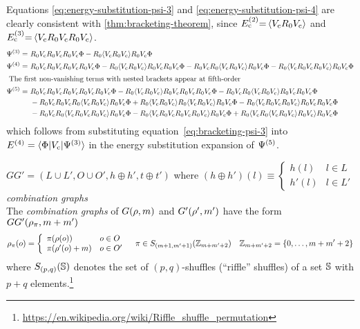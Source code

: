 \documentclass[11pt]{article}
\numberwithin{equation}{section}
\begin{document}
\begin{ex}
Equations \ref{eq:energy-substitution-psi-3} and \ref{eq:energy-substitution-psi-4} are clearly consistent with \cref{thm:bracketing-theorem}, since $E_{\mathrm{c}}^{(2)}{=}\,\langle V_{\mathrm{c}}R_0V_{\mathrm{c}}\rangle$ and $E_{\mathrm{c}}^{(3)}{=}\,\langle V_{\mathrm{c}}R_0V_{\mathrm{c}}R_0V_{\mathrm{c}}\rangle$.
\begin{align}
\label{eq:bracketing-psi-3}
  \Psi ^{(3)}
=&\
  R_0V_{\mathrm{c}}R_0V_{\mathrm{c}}R_0V_{\mathrm{c}}\Phi 
-
  R_0\langle V_{\mathrm{c}}R_0V_{\mathrm{c}}\rangle R_0V_{\mathrm{c}}\Phi 
\\
  \Psi ^{(4)}
=&\
  R_0V_{\mathrm{c}}R_0V_{\mathrm{c}}R_0V_{\mathrm{c}}R_0V_{\mathrm{c}}\Phi 
-
  R_0\langle V_{\mathrm{c}}R_0V_{\mathrm{c}}\rangle R_0V_{\mathrm{c}}R_0V_{\mathrm{c}}\Phi 
-
  R_0V_{\mathrm{c}}R_0\langle V_{\mathrm{c}}R_0V_{\mathrm{c}}\rangle R_0V_{\mathrm{c}}\Phi 
-
  R_0\langle V_{\mathrm{c}}R_0V_{\mathrm{c}}R_0V_{\mathrm{c}}\rangle R_0V_{\mathrm{c}}\Phi 
\\
\intertext{
The first non-vanishing terms with nested brackets appear at fifth-order
}
\nonumber
  \Psi ^{(5)}
=&\
  R_0V_{\mathrm{c}}R_0V_{\mathrm{c}}R_0V_{\mathrm{c}}R_0V_{\mathrm{c}}R_0V_{\mathrm{c}}\Phi 
-
  R_0\langle V_{\mathrm{c}}R_0V_{\mathrm{c}}\rangle R_0V_{\mathrm{c}}R_0V_{\mathrm{c}}R_0V_{\mathrm{c}}\Phi 
-
  R_0V_{\mathrm{c}}R_0\langle V_{\mathrm{c}}R_0V_{\mathrm{c}}\rangle R_0V_{\mathrm{c}}R_0V_{\mathrm{c}}\Phi 
\\&\
\nonumber
-
  R_0V_{\mathrm{c}}R_0V_{\mathrm{c}}R_0\langle V_{\mathrm{c}}R_0V_{\mathrm{c}}\rangle R_0V_{\mathrm{c}}\Phi 
+
  R_0\langle V_{\mathrm{c}}R_0V_{\mathrm{c}}\rangle R_0\langle V_{\mathrm{c}}R_0V_{\mathrm{c}}\rangle R_0V_{\mathrm{c}}\Phi 
-
  R_0\langle V_{\mathrm{c}}R_0V_{\mathrm{c}}R_0V_{\mathrm{c}}\rangle R_0V_{\mathrm{c}}R_0V_{\mathrm{c}}\Phi 
\\&\
-
  R_0V_{\mathrm{c}}R_0\langle V_{\mathrm{c}}R_0V_{\mathrm{c}}R_0V_{\mathrm{c}}\rangle R_0V_{\mathrm{c}}\Phi 
-
  R_0\langle V_{\mathrm{c}}R_0V_{\mathrm{c}}R_0V_{\mathrm{c}}R_0V_{\mathrm{c}}\rangle R_0V_{\mathrm{c}}\Phi 
+
  R_0\langle V_{\mathrm{c}}R_0\langle V_{\mathrm{c}}R_0V_{\mathrm{c}}\rangle R_0V_{\mathrm{c}}\rangle R_0V_{\mathrm{c}}\Phi 
\end{align}
which follows from substituting equation~\ref{eq:bracketing-psi-3} into $E^{(4)}=\langle\Phi |V_{\mathrm{c}}|\Psi ^{(3)}\rangle$ in the energy substitution expansion of $\Psi ^{(5)}$.
\end{ex}

\begin{dfn}

$
  GG'
=
  (
    L\cup L',
    O\cup O',
    h\oplus h',
    t\oplus t'
  )
$
where
$
  (h\oplus h')(l)
\equiv
\left\{
\begin{array}{ll}
  h(l) & l\in L\\
  h'(l) & l\in L'
\end{array}
\right.
$\\
\textit{combination graphs}\\
The \textit{combination graphs} of $G(\rho ,m)$ and $G'(\rho ',m')$ have the form
$GG'(\rh_\pi,m+m')$\\
\begin{align*}
  \rh_\pi(o)
=
\left\{
\begin{array}{ll}
  \pi(\rh(o))      & o\in O\\
  \pi(\rh'(o) + m) & o\in O'
\end{array}
\right.
&&
  \pi
\in
  S_{(m+1,m'+1)}
  (\mb{Z}_{m+m'+2})
&&
  \mb{Z}_{m+m'+2}
=
  \{
    0,
    \ld,
    m+m'+2
  \}
\end{align*}
where $S_{(p,q)}(\mathbb{S})$ denotes the set of $(p,q)$-shuffles (``riffle'' shuffles) of a set $\mathbb{S}$ with $p+q$ elements.\footnote{\url{https://en.wikipedia.org/wiki/Riffle_shuffle_permutation}}
\end{dfn}
\end{document}
